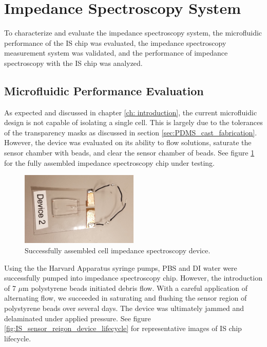 \FloatBarrier

\section{Impedance Spectroscopy System}

\par To characterize and evaluate the impedance spectroscopy system, the microfluidic performance of the IS chip was evaluated, the impedance spectroscopy measurement system was validated, and the performance of impedance spectroscopy with the IS chip was analyzed. 

\subsection{Microfluidic Performance Evaluation}

\par As expected and discussed in chapter \ref{ch: introduction}, the current microfluidic design is not capable of isolating a single cell. This is largely due to the tolerances of the transparency masks as discussed in section \ref{sec:PDMS_cast_fabrication}. However, the device was evaluated on its ability to flow solutions, saturate the sensor chamber with beads, and clear the sensor chamber of beads. See figure \ref{fig:assembled_good_device} for the fully assembled impedance spectroscopy chip under testing. 

\begin{figure}[h]
    \centering
    \includegraphics[width=0.5\textwidth]{images/device_22.jpg}
    \caption{Successfully assembled cell impedance spectroscopy device.}
    \label{fig:assembled_good_device}
\end{figure}

\par Using the the Harvard Apparatus syringe pumps, PBS and DI water were successfully pumped into impedance spectroscopy chip. However, the introduction of 7 $\mu$m polystyrene beads initiated debris flow. With a careful application of alternating flow, we succeeded in saturating and flushing the sensor region of polystyrene beads over several days. The device was ultimately jammed and delaminated under applied pressure. See figure \ref{fig:IS_sensor_reigon_device_lifecycle} for representative images of IS chip lifecycle.

